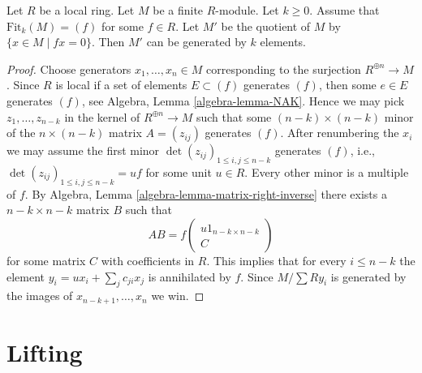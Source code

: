 \begin{lemma}
\label{lemma-principal-fitting-ideal}
Let $R$ be a local ring. Let $M$ be a finite $R$-module. Let $k \geq 0$.
Assume that $\text{Fit}_k(M) = (f)$ for some $f \in R$.
Let $M'$ be the quotient of $M$ by $\{x \in M \mid fx = 0\}$. Then
$M'$ can be generated by $k$ elements.
\end{lemma}

\begin{proof}
Choose generators $x_1, \ldots, x_n \in M$ corresponding to the
surjection $R^{\oplus n} \to M$. Since $R$ is local if a set
of elements $E \subset (f)$ generates $(f)$, then some $e \in E$ generates
$(f)$, see Algebra, Lemma \ref{algebra-lemma-NAK}. Hence we may pick
$z_1, \ldots, z_{n - k}$ in the kernel of $R^{\oplus n} \to M$ such
that some $(n - k) \times (n - k)$ minor of the $n \times (n - k)$
matrix $A = (z_{ij})$ generates $(f)$. After renumbering the $x_i$ we may
assume the first minor $\det(z_{ij})_{1 \leq i, j \leq n - k}$
generates $(f)$, i.e., $\det(z_{ij})_{1 \leq i, j \leq n - k} = uf$
for some unit $u \in R$. Every other minor is a multiple of $f$.
By Algebra, Lemma \ref{algebra-lemma-matrix-right-inverse} there exists a
$n - k \times n - k$ matrix $B$ such that
$$
AB = f
\left(
\begin{matrix}
u 1_{n - k \times n - k} \\
C
\end{matrix}
\right)
$$
for some matrix $C$ with coefficients in $R$. This implies that for every
$i \leq n - k$ the element $y_i = ux_i + \sum_j c_{ji}x_j$ is annihilated
by $f$. Since $M/\sum Ry_i$ is generated by the images of
$x_{n - k + 1}, \ldots, x_n$ we win.
\end{proof}










\section{Lifting}
\label{section-lifting}

